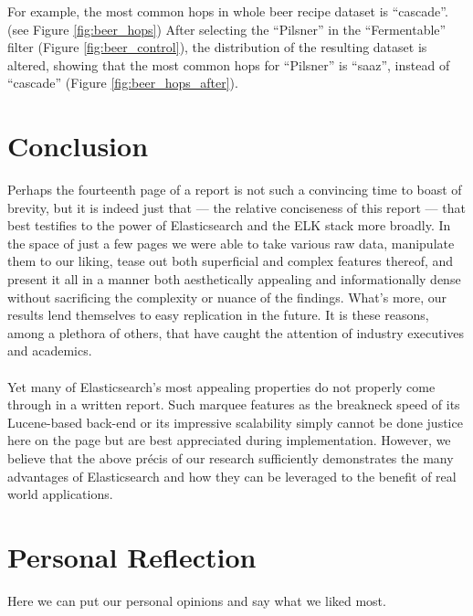 \documentclass[bibliography=totoc]{article}
\begin{document}

For example, the most common hops in whole beer recipe dataset is ``cascade''. (see Figure \ref{fig:beer_hops}) After selecting the ``Pilsner'' in the ``Fermentable'' filter (Figure \ref{fig:beer_control}), the distribution of the resulting dataset is altered, showing that the most common hops for ``Pilsner'' is ``saaz'', instead of ``cascade'' (Figure \ref{fig:beer_hops_after}). 


\section{Conclusion}
Perhaps the fourteenth page of a report is not such a convincing time to boast of brevity, but it is
indeed just that — the relative conciseness of this report — that best testifies to the power of Elasticsearch
and the ELK stack more broadly. In the space of just a few pages we were able to take various raw data,
manipulate them to our liking, tease out both superficial and complex features thereof, and present it all in
a manner both aesthetically appealing and informationally dense without sacrificing the complexity or nuance
of the findings. What's more, our results lend themselves to easy replication in the future. It is these
reasons, among a plethora of others, that have caught the attention of industry executives and academics.
\\
\\
Yet many of Elasticsearch's most appealing properties do not properly come through in a written report.
Such marquee features as the breakneck speed of its Lucene-based back-end or its impressive scalability
simply cannot be done justice here on the page but are best appreciated during implementation. However, we
believe that the above précis of our research sufficiently demonstrates the many advantages of Elasticsearch
and how they can be leveraged to the benefit of real world applications.

\section{Personal Reflection}
Here we can put our personal opinions and say what we liked most.
\end{document}
